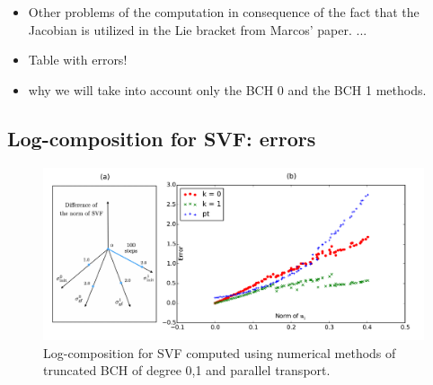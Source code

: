\begin{itemize}
	\item Other problems of the computation in consequence of the fact that the Jacobian is utilized in the Lie bracket from Marcos' paper. ...
	\item Table with errors!
	\item why we will take into account only the BCH 0 and the BCH 1 methods.
\end{itemize}

\subsection{Log-composition for SVF: errors}




\begin{figure}[!ht]
	\hspace{-1.5cm}
	\includegraphics[scale=0.6]{figures/SVF_scatter_plot.pdf}
	\caption{Log-composition for SVF computed using numerical methods of truncated BCH of degree 0,1 and parallel transport.}
	\label{fig:SVF_scatter_plot}
\end{figure}


